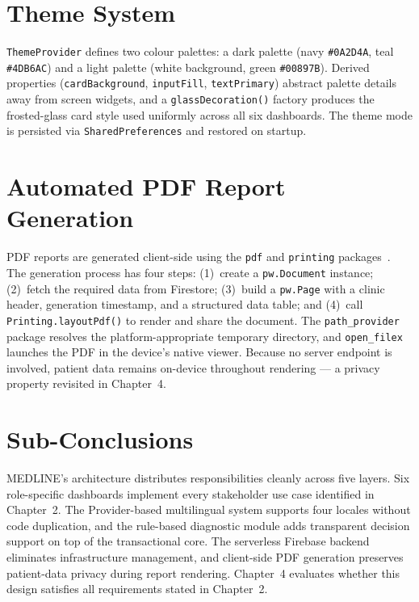 \documentclass[12pt,a4paper,oneside]{report}
\begin{document}
\section{Theme System}

\texttt{ThemeProvider} defines two colour palettes: a dark palette
(navy \texttt{\#0A2D4A}, teal \texttt{\#4DB6AC}) and a light palette (white
background, green \texttt{\#00897B}). Derived properties
(\texttt{cardBackground}, \texttt{inputFill}, \texttt{textPrimary}) abstract
palette details away from screen widgets, and a \texttt{glassDecoration()}
factory produces the frosted-glass card style used uniformly across all six
dashboards. The theme mode is persisted via \texttt{SharedPreferences} and
restored on startup.

\section{Automated PDF Report Generation}

PDF reports are generated client-side using the \texttt{pdf} and
\texttt{printing} packages~\cite{pdfpkg2024}. The generation process has four
steps: (1)~create a \texttt{pw.Document} instance; (2)~fetch the required data
from Firestore; (3)~build a \texttt{pw.Page} with a clinic header, generation
timestamp, and a structured data table; and (4)~call
\texttt{Printing.layoutPdf()} to render and share the document. The
\texttt{path\_provider} package resolves the platform-appropriate temporary
directory, and \texttt{open\_filex} launches the PDF in the device's native
viewer. Because no server endpoint is involved, patient data remains on-device
throughout rendering --- a privacy property revisited in Chapter~4.

\section{Sub-Conclusions}

MEDLINE's architecture distributes responsibilities cleanly across five layers.
Six role-specific dashboards implement every stakeholder use case identified in
Chapter~2. The Provider-based multilingual system supports four locales without
code duplication, and the rule-based diagnostic module adds transparent decision
support on top of the transactional core. The serverless Firebase backend
eliminates infrastructure management, and client-side PDF generation preserves
patient-data privacy during report rendering. Chapter~4 evaluates whether this
design satisfies all requirements stated in Chapter~2.
\end{document}
